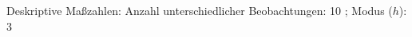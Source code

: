 				\label{tableValues:afec022h_g3}
				\vspace*{-\baselineskip}
                    \begin{noten}
                	    \note{} Deskriptive Maßzahlen:
                	    Anzahl unterschiedlicher Beobachtungen: 10%
                	    ; 
                	      Modus ($h$): 3
                     \end{noten}

